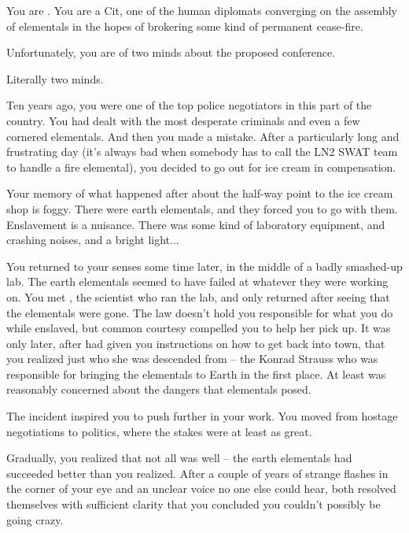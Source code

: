 \documentclass[char]{elementals}
\begin{document}
\name{\cAvatar{}}

You are \cAvatar{\intro}.  You are a Cit, one of the human diplomats converging on the assembly of elementals in the hopes of brokering some kind of permanent cease-fire.

Unfortunately, you are of two minds about the proposed conference.

Literally two minds.

Ten years ago, you were one of the top police negotiators in this part of the country.  You had dealt with the most desperate criminals and even a few cornered elementals.  And then you made a mistake.  After a particularly long and frustrating day (it's always bad when somebody has to call the LN2 SWAT team to handle a fire elemental), you decided to go out for ice cream in compensation.

Your memory of what happened after about the half-way point to the ice cream shop is foggy.  There were earth elementals, and they forced you to go with them.  Enslavement is a nuisance.  There was some kind of laboratory equipment, and crashing noises, and a bright light...

You returned to your senses some time later, in the middle of a badly smashed-up lab.  The earth elementals seemed to have failed at whatever they were working on.  You met \cGD{}, the scientist who ran the lab, and only returned after seeing that the elementals were gone.  The law doesn't hold you responsible for what you do while enslaved, but common courtesy compelled you to help her pick up.  It was only later, after \cGD{\they} had given you instructions on how to get back into town, that you realized just who she was descended from -- the Konrad Strauss who was responsible for bringing the elementals to Earth in the first place.  At least \cGD{\they} was reasonably concerned about the dangers that elementals posed.

The incident inspired you to push further in your work.  You moved from hostage negotiations to politics, where the stakes were at least as great.  

Gradually, you realized that not all was well -- the earth elementals had succeeded better than you realized.  After a couple of years of strange flashes in the corner of your eye and an unclear voice no one else could hear, both resolved themselves with sufficient clarity that you concluded you couldn't possibly be going crazy.
\end{document}
